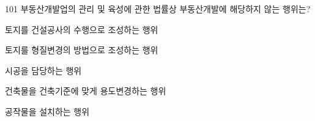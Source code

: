 \begin{question}{101}
부동산개발업의 관리 및 육성에 관한 법률상 부동산개발에 해당하지 않는 행위는?
\begin{choices}
  \item 토지를 건설공사의 수행으로 조성하는 행위
  \item 토지를 형질변경의 방법으로 조성하는 행위
  \item 시공을 담당하는 행위
  \item 건축물을 건축기준에 맞게 용도변경하는 행위
  \item 공작물을 설치하는 행위
\end{choices}
\end{question}
